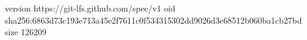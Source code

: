 version https://git-lfs.github.com/spec/v1
oid sha256:6863d73c193e713a45e2f7611c0f534315302dd9026d3e68512b060ba1cb27bd
size 126209
